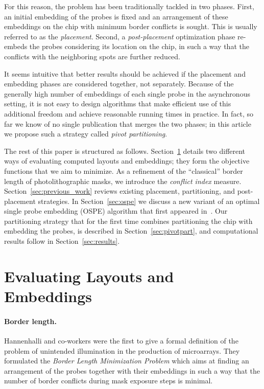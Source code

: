 \documentclass{llncs}
\begin{document}
For this reason, the problem has been traditionally tackled in two phases.
First, an initial embedding of the probes is fixed and an arrangement of these
embeddings on the chip with minimum border conflicts is sought. This is
usually referred to as the \emph{placement}. Second, a \emph{post-placement}
optimization phase re-embeds the probes considering its location on the chip,
in such a way that the conflicts with the neighboring spots are further
reduced.

It seems intuitive that better results should be achieved if the placement and
embedding phases are considered together, not separately. Because of the
generally high number of embeddings of each single probe in the asynchronous
setting, it is not easy to design algorithms that make efficient use of this
additional freedom and achieve reasonable running times in practice. In fact,
so far we know of no single publication that merges the two phases; in this
article we propose such a strategy called \emph{pivot partitioning}.

The rest of this paper is structured as follows. Section~\ref{sec:eval}
details two different ways of evaluating computed layouts and embeddings; they
form the objective functions that we aim to minimize. As a refinement of the
``classical'' border length of photolithographic masks, we introduce the
\emph{conflict index} measure. Section~\ref{sec:previous_work} reviews
existing placement, partitioning, and post-placement strategies.  In
Section~\ref{sec:ospe} we discuss a new variant of an optimal single probe
embedding (OSPE) algorithm that first appeared in~\cite{KAHNG02}. Our
partitioning strategy that for the first time combines partitioning the chip
with embedding the probes, is described in Section~\ref{sec:pivotpart}, and
computational results follow in Section~\ref{sec:results}.



\section{Evaluating Layouts and Embeddings}
\label{sec:eval}

\paragraph{Border length.}
Hannenhalli and co-workers \cite{HANNENHALLI02} were the first to give a
formal definition of the problem of unintended illumination in the production
of microarrays. They formulated the \emph{Border Length Minimization Problem}
which aims at finding an arrangement of the probes together with their
embeddings in such a way that the number of border conflicts during mask
exposure steps is minimal.
\end{document}
